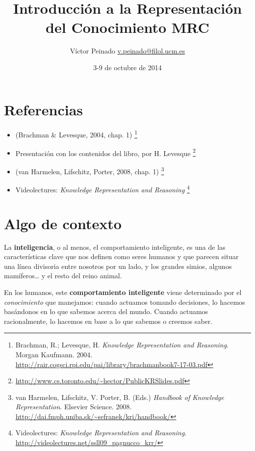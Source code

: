 \documentclass{tufte-handout}
\title{Introducción a la Representación del Conocimiento \textbar{} MRC}
\author{Víctor Peinado
\href{mailto:v.peinado@filol.ucm.es}{v.peinado@filol.ucm.es}}
\date{3-9 de octubre de 2014}
\begin{document}
\maketitle



\section{Referencias}\label{referencias}

\begin{itemize}
\itemsep1pt\parskip0pt
\item
  (Brachman \& Levesque, 2004, chap. 1) \footnote{Brachman, R.;
    Levesque, H. \emph{Knowledge Representation and Reasoning}. Morgan
    Kaufmann. 2004.
    \url{http://rair.cogsci.rpi.edu/pai/library/brachmanbook7-17-03.pdf}}
\item
  Presentación con los contenidos del libro, por H. Levesque \footnote{\url{http://www.cs.toronto.edu/~hector/PublicKRSlides.pdf}}
\item
  (van Harmelen, Lifschitz, Porter, 2008, chap. 1) \footnote{van
    Harmelen, Lifschitz, V. Porter, B. (Eds.) \emph{Handbook of
    Knowledge Representation}. Elsevier Science. 2008.
    \url{http://dai.fmph.uniba.sk/~sefranek/kri/handbook/}}
\item
  Videolectures: \emph{Knowledge Representation and Reasoning}
  \footnote{Videolectures: \emph{Knowledge Representation and
    Reasoning}. \url{http://videolectures.net/ssll09_pagnucco_krr/}}
\end{itemize}

\section{Algo de contexto}\label{algo-de-contexto}

La \textbf{inteligencia}, o al menos, el comportamiento inteligente, es
una de las características clave que nos definen como seres humanos y
que parecen situar una línea divisoria entre nosotros por un lado, y los
grandes simios, algunos mamíferos\ldots{} y el resto del reino animal.

En los humanos, este \textbf{comportamiento inteligente} viene
determinado por el \emph{conocimiento} que manejamos: cuando actuamos
tomando decisiones, lo hacemos basándonos en lo que sabemos acerca del
mundo. Cuando actuamos racionalmente, lo hacemos en base a lo que
sabemos o creemos
saber.
\end{document}
